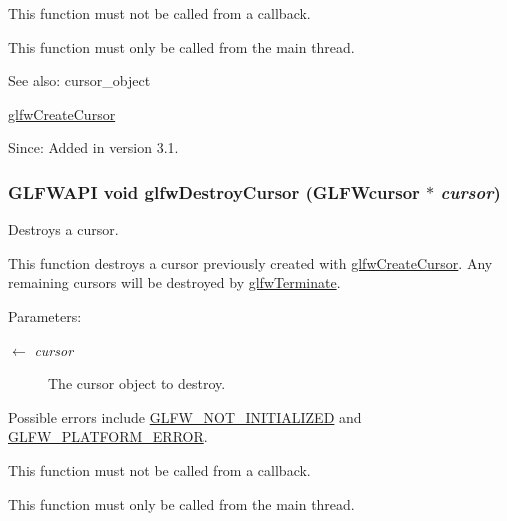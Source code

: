 This function must not be called from a callback.

This function must only be called from the main thread.

\begin{Desc}
\item[See also:]cursor\_\-object 

\hyperlink{group__input_gc0f0f691f2d110f9acfb4bfe07f1216c}{glfwCreateCursor}\end{Desc}
\begin{Desc}
\item[Since:]Added in version 3.1. \end{Desc}
\hypertarget{group__input_g27556b7122117bc1bbb4bb3cc003ea43}{
\subsubsection[glfwDestroyCursor]{\setlength{\rightskip}{0pt plus 5cm}GLFWAPI void glfwDestroyCursor ({\bf GLFWcursor} $\ast$ {\em cursor})}}
\label{group__input_g27556b7122117bc1bbb4bb3cc003ea43}


Destroys a cursor. 

This function destroys a cursor previously created with \hyperlink{group__input_gc0f0f691f2d110f9acfb4bfe07f1216c}{glfwCreateCursor}. Any remaining cursors will be destroyed by \hyperlink{group__init_gfd90e6fd4819ea9e22e5e739519a6504}{glfwTerminate}.

\begin{Desc}
\item[Parameters:]
\begin{description}
\item[\mbox{$\leftarrow$} {\em cursor}]The cursor object to destroy.\end{description}
\end{Desc}
Possible errors include \hyperlink{group__errors_g2374ee02c177f12e1fa76ff3ed15e14a}{GLFW\_\-NOT\_\-INITIALIZED} and \hyperlink{group__errors_gd44162d78100ea5e87cdd38426b8c7a1}{GLFW\_\-PLATFORM\_\-ERROR}.

This function must not be called from a callback.

This function must only be called from the main thread.


